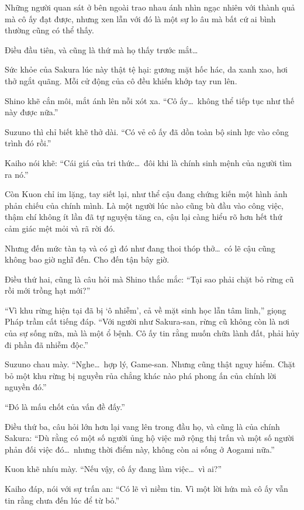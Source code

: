\documentclass[../main.tex]{subfiles}
\begin{document}
Những người quan sát ở bên ngoài trao nhau ánh nhìn ngạc nhiên với thành quả mà cô ấy đạt được, nhưng xen lẫn với đó là một sự lo âu mà bất cứ ai bình thường cũng có thể thấy.

Điều đầu tiên, và cũng là thứ mà họ thấy trước mắt\dots

Sức khỏe của Sakura lúc này thật tệ hại: gương mặt hốc hác, da xanh xao, hơi thở ngắt quãng. Mỗi cử động của cô đều khiến khớp tay run lên.

Shino khẽ cắn môi, mắt ánh lên nỗi xót xa. ``Cô ấy\dots\ không thể tiếp tục như thế này được nữa.''

Suzuno thì chỉ biết khẽ thở dài. ``Có vẻ cô ấy đã dồn toàn bộ sinh lực vào công trình đó rồi.''

Kaiho nói khẽ: ``Cái giá của tri thức\dots\ đôi khi là chính sinh mệnh của người tìm ra nó.''

Còn Kuon chỉ im lặng, tay siết lại, như thể cậu đang chứng kiến một hình ảnh phản chiếu của chính mình. Là một người lúc nào cũng bù đầu vào công việc, thậm chí không ít lần đã tự nguyện tăng ca, cậu lại càng hiểu rõ hơn hết thứ cảm giác mệt mỏi và rã rời đó.

Nhưng đến mức tàn tạ và có gì đó như đang thoi thóp thở\dots\ có lẽ cậu cũng không bao giờ nghĩ đến. Cho đến tận bây giờ.

Điều thứ hai, cũng là câu hỏi mà Shino thắc mắc: ``Tại sao phải chặt bỏ rừng cũ rồi mới trồng hạt mới?''

``Vì khu rừng hiện tại đã bị `ô nhiễm', cả về mặt sinh học lẫn tâm linh,'' giọng Pháp trầm cất tiếng đáp. ``Với người như Sakura-san, rừng cũ không còn là nơi của sự sống nữa, mà là một ổ bệnh. Cô ấy tin rằng muốn chữa lành đất, phải hủy đi phần đã nhiễm độc.''

Suzuno chau mày. ``Nghe\dots\ hợp lý, Game-san. Nhưng cũng thật nguy hiểm. Chặt bỏ một khu rừng bị nguyền rủa chẳng khác nào phá phong ấn của chính lời nguyền đó.''

``Đó là mấu chốt của vấn đề đấy.''

Điều thứ ba, câu hỏi lớn hơn lại vang lên trong đầu họ, và cũng là của chính Sakura: ``Dù rằng có một số người ủng hộ việc mở rộng thị trấn và một số người phản đối việc đó\dots\ nhưng thời điểm này, không còn ai sống ở Aogami nữa.''

Kuon khẽ nhíu mày. ``Nếu vậy, cô ấy đang làm việc\dots\ vì ai?''

Kaiho đáp, nói với sự trấn an: ``Có lẽ vì niềm tin. Vì một lời hứa mà cô ấy vẫn tin rằng chưa đến lúc để từ bỏ.''
\end{document}
